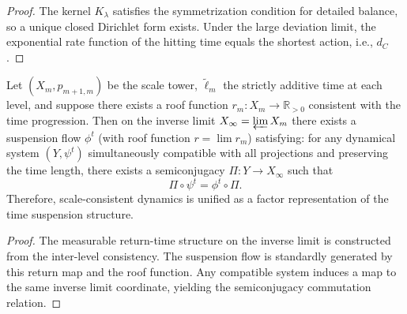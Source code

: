 \begin{proof}
The kernel \(K_\lambda\) satisfies the symmetrization condition for detailed balance, so a unique closed Dirichlet form exists.
Under the large deviation limit, the exponential rate function of the hitting time equals the shortest action, i.e., \(d_C\).
\end{proof}

\begin{theorem}\label{thm:xi-suspension-flow-universality}
Let \((X_m,p_{m+1,m})\) be the scale tower, \(\widetilde\ell_m\) the strictly additive time at each level, and suppose there exists a roof function \(r_m:X_m\to\mathbb R_{>0}\) consistent with the time progression.
Then on the inverse limit \(X_\infty=\varprojlim X_m\) there exists a suspension flow \(\phi^t\) (with roof function \(r=\lim r_m\)) satisfying: for any dynamical system \((Y,\psi^t)\) simultaneously compatible with all projections and preserving the time length, there exists a semiconjugacy \(\Pi:Y\to X_\infty\) such that
\[
\Pi\circ\psi^t=\phi^t\circ\Pi.
\]
Therefore, scale-consistent dynamics is unified as a factor representation of the time suspension structure.
\end{theorem}

\begin{proof}
The measurable return-time structure on the inverse limit is constructed from the inter-level consistency.
The suspension flow is standardly generated by this return map and the roof function.
Any compatible system induces a map to the same inverse limit coordinate, yielding the semiconjugacy commutation relation.
\end{proof}
